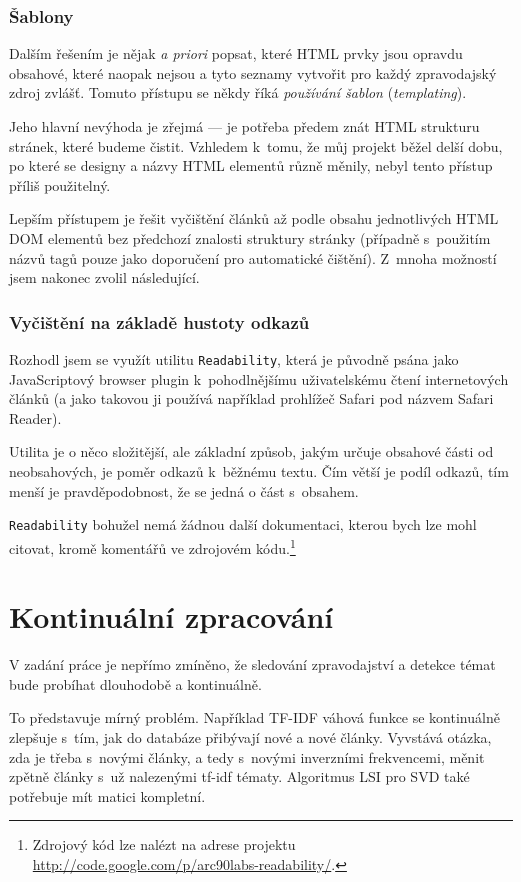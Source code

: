 \documentclass[12pt,a4paper]{report}
\begin{document}
\subsubsection{Šablony}
Dalším řešením je nějak \emph{a priori} popsat, které HTML prvky jsou opravdu obsahové, které naopak nejsou a tyto seznamy vytvořit pro každý zpravodajský zdroj zvlášť. Tomuto přístupu se někdy říká \emph{používání šablon} (\emph{templating}).

Jeho hlavní nevýhoda je zřejmá --- je potřeba předem znát HTML strukturu stránek, které budeme čistit. Vzhledem k~tomu, že můj projekt běžel delší dobu, po které se designy a názvy HTML elementů různě měnily, nebyl tento přístup příliš použitelný.

Lepším přístupem je řešit vyčištění článků až podle obsahu jednotlivých HTML DOM elementů bez předchozí znalosti struktury stránky (případně s~použitím názvů tagů pouze jako doporučení pro automatické čištění). Z~mnoha možností jsem nakonec zvolil následující.

\subsubsection{Vyčištění na základě hustoty odkazů}
Rozhodl jsem se využít utilitu \texttt{Readability}, která je původně psá\-na ja\-ko Java\-Scri\-pto\-vý brow\-ser plu\-g\-in k~pohodlnějšímu uživatelskému čtení in\-ter\-net\-o\-vých člán\-ků (a jako takovou ji používá například prohlížeč Safari pod názvem Safari Reader). 

Utilita je o něco složitější, ale základní způsob, jakým určuje obsahové části od neobsahových, je poměr odkazů k~běžnému textu. Čím větší je podíl odkazů, tím menší je pravděpodobnost, že se jedná o část s~obsahem. 

\texttt{Readability} bohužel nemá žádnou další dokumentaci, kterou bych lze mohl citovat, kromě komentářů ve zdrojovém kódu.\footnote{Zdrojový kód lze nalézt na adrese projektu \\ \hspace*{1.5em} \url{http://code.google.com/p/arc90labs-readability/}.}


\section{Kontinuální zpracování}
V zadání práce je nepřímo zmíněno, že sledování zpravodajství a detekce témat bude probíhat dlouhodobě a kontinuálně.

To představuje mírný problém. Například TF-IDF váhová funkce se kontinuálně zlepšuje s~tím, jak do databáze přibývají nové a nové články. Vyvstává otázka, zda je třeba s~novými články, a tedy s~novými inverzními frekvencemi, měnit zpětně články s~už nalezenými tf-idf tématy. Algoritmus LSI pro SVD také potřebuje mít matici kompletní.
\end{document}
